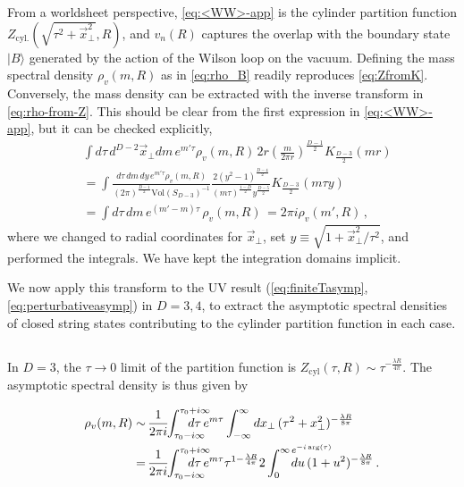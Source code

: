 \documentclass[
 reprint,
 amsmath,
 pre,
 amssymb,
 nofootinbib,
 aps,
 longbibliography,
]{revtex4-1}
\newcommand{\<}{{\langle}}
\renewcommand{\>}{{\rangle}}
\begin{document}
From a worldsheet perspective, \eqref{eq:<WW>-app} is the cylinder partition function $Z_{\text{cyl.}}(\sqrt{\tau^2 + \vec x_\bot^2},R)$, and $v_n(R)$ captures the overlap with the boundary state $|B\rangle$ generated by the action of the Wilson loop on the vacuum. Defining the mass spectral density $\rho_v( m, R)$ as in \eqref{eq:rho_B} readily reproduces \eqref{eq:ZfromK}. Conversely, the mass density can be extracted with the inverse transform in \eqref{eq:rho-from-Z}. This should be clear from the first expression in \eqref{eq:<WW>-app}, but it can be checked explicitly,
\begin{align}\label{eq:expl-inv-transf}
    &\int {d\tau\, d^{D-2}\vec x_\bot  d m}\, e^{ m' \tau} \rho_v( m,R)\, 2r \left(\frac{ m}{2\pi r}\right)^{\frac{D-1}{2}} K_{\frac{D-3}{2}}\left( m r\right) \nonumber \\
    &=\int \frac{d\tau\,  d m\, dy \, e^{ m' \tau} \rho_v( m,R)}{(2\pi)^{\frac{D-1}{2}}  \text{Vol}(S_{D-3})^{-1}}
   \frac{2 (y^2-1)^\frac{D-4}{2}}{\left( m\tau\right)^{\frac{1-D}{2}} y^{\frac{D-5}{2}}} K_{\frac{D-3}{2}}\left( m \tau y\right) \nonumber\\
    &=\int d\tau \,  d m\, e^{( m' -  m)\tau}
    \, \rho_v( m,R)\,=
     2 \pi i \rho_v( m',R)\,,
\end{align}
where we changed to radial coordinates for $\vec x_\bot$, set $y\equiv\sqrt{1+\vec x_\bot^2/\tau^2}$, and performed the integrals. We have kept the integration domains implicit.

We now apply this transform to the UV result (\ref{eq:finiteTasymp},\ref{eq:perturbativeasymp}) in $D=3,4$, to extract the asymptotic spectral densities of closed string states contributing to the cylinder partition function in each case.

\subsection{}\label{app:rhosD=3}

In $D=3$, the $\tau\to 0$ limit of the partition function is $Z_{\text{cyl}}(\tau,R) \sim \tau^{-\frac{\lambda R}{4\pi}}$. The asymptotic spectral density is thus given by

\begin{align}
    \rho_v( m,R) \sim&\,\frac{1}{2\pi i}\hspace{-3pt}\int_{\tau_0 - i\infty}^{\tau_0+i\infty} \hspace{-20pt}d\tau\, e^{ m \tau}\int_{-\infty}^{\infty} dx_\bot \,(\tau^2 + x_\bot^2)^{-\frac{\lambda R}{8\pi}} \nonumber\\
    =&\,\frac{1}{2\pi i}\hspace{-3pt}\int_{\tau_0 - i\infty}^{\tau_0+i\infty} \hspace{-20pt}d\tau\, e^{ m \tau}\tau^{1-\frac{\lambda R}{4\pi}} 2\int_0^{\infty \, e^{-i \arg(\tau) }}\hspace{-35pt} du \,(1 + u^2)^{-\frac{\lambda R}{8\pi}}\,.
\end{align}
\end{document}
